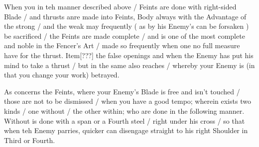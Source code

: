 
When you in teh manner described above / Feints are done with
right-sided Blade / and thrusts anre made into Feints, Body always
with the Advantage of the strong / and the weak may frequently ( as by
his Enemy's can be forsaken ) be sacrificed / the Feints are made
complete / and is one of the most complete and noble in the Fencer's
Art / made so frequently when one no full measure have for the
thrust. Item[???] the false
openings and when the Enemy has put his mind to take a thrust / but in
the same also reaches / whereby your Enemy is (in that you change your
work) betrayed.


As concerns the Feints, where your Enemy's Blade is free and isn't
touched / those are not to be dismissed / when you have a good tempo;
wherein exists two kinds / one without / the other within; who are
done in the following manner. Without is done with a span or a Fourth
steel / right under his cross / so that when teh Enemy parries, quicker
can disengage straight to his right Shoulder in Third or Fourth.


